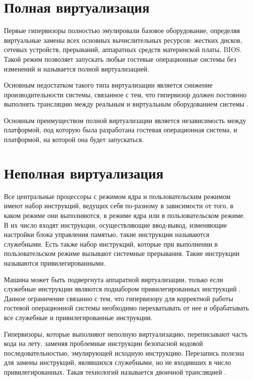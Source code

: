 \section{Полная виртуализация}

Первые гипервизоры полностью эмулировали базовое оборудование, определяя виртуальные замены всех основных вычислительных ресурсов: жестких дисков, сетевых устройств, прерываний, аппаратных средств материнской платы, BIOS. Такой режим позволяет запускать любые гостевые операционные системы без изменений и называется полной виртуализацией.

Основным недостатком такого типа виртуализации является снижение производительности системы, связанное с тем, что гипервизор должен постоянно выполнять трансляцию между реальным и виртуальным оборудованием системы \cite{admin}.

Основным преимуществом полной виртуализации является независимость между платформой, под которую была разработана гостевая операционная система, и платформой, на которой она будет запускаться.

\section{Неполная виртуализация}

Все центральные процессоры с режимом ядра и пользовательским режимом имеют набор инструкций, ведущих себя по-разному в зависимости от того, в каком режиме они выполняются, в режиме ядра или в пользовательском режиме.
В их число входят инструкции, осуществляющие ввод-вывод, изменяющие настройки блока управления памятью, такие инструкции называются служебными.
Есть также набор инструкций, которые при выполнении в пользовательском режиме вызывают системные прерывания. 
Такие инструкции называются привилегированными.

Машина может быть подвергнута аппаратной виртуализации, только если служебные инструкции являются поднабором привилегированных инструкций \cite{tanenbaumOS}.
Данное ограничение связанно с тем, что гипервизору для корректной работы гостевой операционной системы необходимо перехватывать от нее и обрабатывать все служебные и привилегированные инструкции.

Гипервизоры, которые выполняют неполную виртуализацию, переписывают часть кода на лету, заменяя проблемные инструкции безопасной кодовой последовательностью, эмулирующей исходную инструкцию.
Перезапись полезна для замены инструкций, являвшихся служебными, но не входивших в число привилегированных.
Такая технологий называется двоичной трансляцией \cite{tanenbaumOS}.

